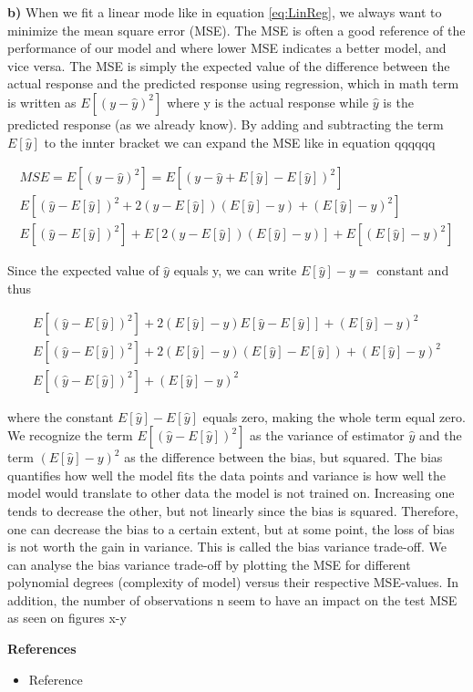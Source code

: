 \documentclass[12pt,a4paper]{article}
\begin{document}
\newpage

\noindent \textbf{b)} When we fit a linear mode like in equation \ref{eq:LinReg}, we always want to minimize the mean square error (MSE). The MSE is often a good reference of the performance of our model and where lower MSE indicates a better model, and vice versa. The MSE is simply the expected value of the difference between the actual response and the predicted response using regression, which in math term is written as $E[(y-\hat{y})^2]$ where y is the actual response while $\hat{y}$ is the predicted response (as we already know). By adding and subtracting the term $E[\hat{y}]$ to the innter bracket we can expand the MSE like in equation qqqqqq

\begin{equation}\label{eq:mseDerive}
\begin{aligned}
MSE = E[(y-\hat{y})^2] = E[(y-\hat{y} + E[\hat{y}] - E[\hat{y}])^2]
\\
E[(\hat{y} - E[\hat{y}])^2 + 2(\hat{y} - E[\hat{y}])(E[\hat{y}]-y) + (E[\hat{y}]-y)^2]
\\
E[(\hat{y} - E[\hat{y}])^2] + E[2(\hat{y} - E[\hat{y}])(E[\hat{y}]-y)] + E[(E[\hat{y}]-y)^2]
\end{aligned}
\end{equation}

\noindent Since the expected value of $\hat{y}$ equals y, we can write $E[\hat{y}] - y =$ constant and thus

\begin{equation}\label{eq:mseDerive2}
\begin{aligned}
E[(\hat{y} - E[\hat{y}])^2] + 2(E[\hat{y}]-y)E[\hat{y}-E[\hat{y}]] + (E[\hat{y}]-y)^2
\\
E[(\hat{y} - E[\hat{y}])^2] + 2(E[\hat{y}]-y)(E[\hat{y}] - E[\hat{y}])+ (E[\hat{y}]-y)^2
\\
E[(\hat{y} - E[\hat{y}])^2] + (E[\hat{y}]-y)^2
\end{aligned}
\end{equation}

where the constant $E[\hat{y}] - E[\hat{y}]$ equals zero, making the whole term equal zero. 
\\
We recognize the term $E[(\hat{y} - E[\hat{y}])^2]$ as the variance of estimator $\hat{y}$ and the term $(E[\hat{y}]-y)^2$ as the difference between the bias, but squared. The bias quantifies how well the model fits the data points and variance is how well the model would translate to other data the model is not trained on. Increasing one tends to decrease the other, but not linearly since the bias is squared. Therefore, one can decrease the bias to a certain extent, but at some point, the loss of bias is not worth the gain in variance. This is called the bias variance trade-off. We can analyse the bias variance trade-off by plotting the MSE for different polynomial degrees (complexity of model) versus their respective MSE-values. In addition, the number of observations n seem to have an impact on the test MSE as seen on figures x-y


\newpage

\begin{center}
\Large{\textbf{References}}
\end{center}

\begin{itemize}
  \item Reference
\end{itemize}
\end{document}
